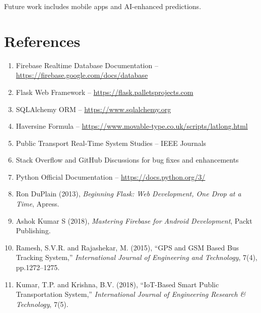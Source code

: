 \documentclass{article}
\begin{document}
\begin{multicols}{2}
\vspace{1em}
Future work includes mobile apps and AI-enhanced predictions.

\section*{References}

\begin{enumerate}
\item Firebase Realtime Database Documentation – \url{https://firebase.google.com/docs/database}
\item Flask Web Framework – \url{https://flask.palletsprojects.com}
\item SQLAlchemy ORM – \url{https://www.sqlalchemy.org}
\item Haversine Formula – \url{https://www.movable-type.co.uk/scripts/latlong.html}
\item Public Transport Real-Time System Studies – IEEE Journals
\item Stack Overflow and GitHub Discussions for bug fixes and enhancements
\item Python Official Documentation – \url{https://docs.python.org/3/}
\item Ron DuPlain (2013), \textit{Beginning Flask: Web Development, One Drop at a Time}, Apress.
\item Ashok Kumar S (2018), \textit{Mastering Firebase for Android Development}, Packt Publishing.
\item Ramesh, S.V.R. and Rajashekar, M. (2015), “GPS and GSM Based Bus Tracking System,” \textit{International Journal of Engineering and Technology}, 7(4), pp.1272–1275.
\item Kumar, T.P. and Krishna, B.V. (2018), “IoT-Based Smart Public Transportation System,” \textit{International Journal of Engineering Research \& Technology}, 7(5).
\end{enumerate}


\end{multicols}
\end{document}
